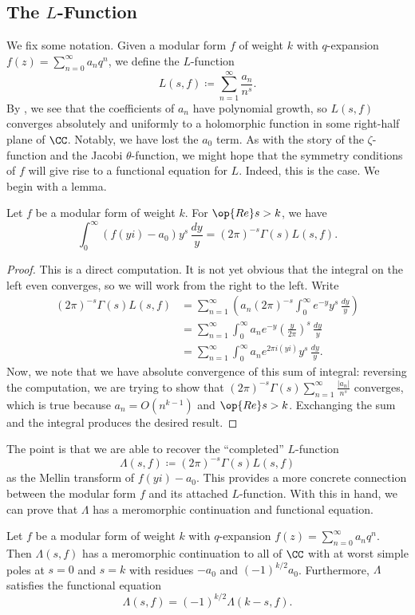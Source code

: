 \documentclass{amsart}
\begin{document}
\subsection{The \texorpdfstring{$L$}{ L}-Function}
We fix some notation. Given a modular form $f$ of weight $k$ with $q$-expansion $f(z)=\sum_{n=0}^\infty a_nq^n$, we define the $L$-function
\[L(s,f)\coloneqq\sum_{n=1}^\infty\frac{a_n}{n^s}.\]
By , we see that the coefficients of $a_n$ have polynomial growth, so $L(s,f)$ converges absolutely and uniformly to a holomorphic function in some right-half plane of $\CC$. Notably, we have lost the $a_0$ term. As with the story of the $\zeta$-function and the Jacobi $\theta$-function, we might hope that the symmetry conditions of $f$ will give rise to a functional equation for $L$. Indeed, this is the case. We begin with a lemma.
\begin{lemma} \label{lem:computed-completed-l-func}
	Let $f$ be a modular form of weight $k$. For $\op{Re}s>k$, we have
	\[\int_0^\infty(f(yi)-a_0)y^s\,\frac{dy}y=(2\pi)^{-s}\Gamma(s)L(s,f).\]
\end{lemma}
\begin{proof}
	This is a direct computation. It is not yet obvious that the integral on the left even converges, so we will work from the right to the left. Write
	\begin{align*}
		(2\pi)^{-s}\Gamma(s)L(s,f) &= \sum_{n=1}^\infty\left(a_n(2\pi)^{-s}\int_0^\infty e^{-y}y^s\,\frac{dy}y\right) \\
		&= \sum_{n=1}^\infty\int_0^\infty a_ne^{-y}\left(\frac y{2\pi}\right)^s\,\frac{dy}y \\
		&= \sum_{n=1}^\infty\int_0^\infty a_ne^{2\pi i(yi)}y^s\,\frac{dy}y.
	\end{align*}
	Now, we note that we have absolute convergence of this sum of integral: reversing the computation, we are trying to show that $(2\pi)^{-s}\Gamma(s)\sum_{n=1}^\infty\frac{|a_n|}{n^s}$ converges, which is true because $a_n=O\left(n^{k-1}\right)$ and $\op{Re}s>k$. Exchanging the sum and the integral produces the desired result.
\end{proof}
The point is that we are able to recover the ``completed'' $L$-function
\[\Lambda(s,f)\coloneqq(2\pi)^{-s}\Gamma(s)L(s,f)\]
as the Mellin transform of $f(yi)-a_0$. This provides a more concrete connection between the modular form $f$ and its attached $L$-function. With this in hand, we can prove that $\Lambda$ has a meromorphic continuation and functional equation.
\begin{proposition} \label{prop:fe}
	Let $f$ be a modular form of weight $k$ with $q$-expansion $f(z)=\sum_{n=0}^\infty a_nq^n$. Then $\Lambda(s,f)$ has a meromorphic continuation to all of $\CC$ with at worst simple poles at $s=0$ and $s=k$ with residues $-a_0$ and $(-1)^{k/2}a_0$. Furthermore, $\Lambda$ satisfies the functional equation
	\[\Lambda(s,f)=(-1)^{k/2}\Lambda(k-s,f).\]
\end{proposition}
\end{document}
